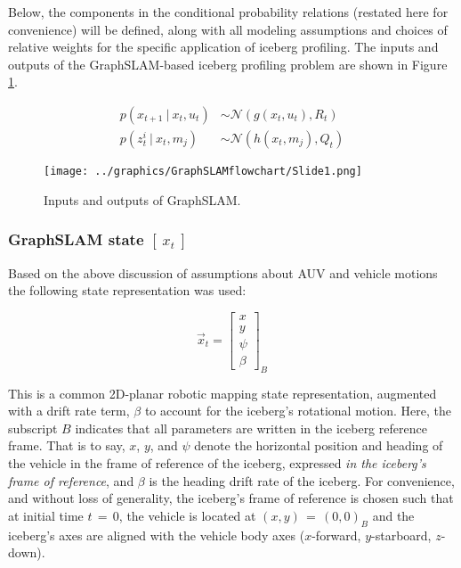 Below, the components in the conditional probability relations (restated here for convenience) will be defined, along with all modeling assumptions and choices of relative weights for the specific application of iceberg profiling. The inputs and outputs of the GraphSLAM-based iceberg profiling problem are shown in Figure \ref{fig:GraphSLAMIO}.

\begin{align}
p\left(x_{t+1}~|~x_t,u_t\right) & \sim \mathcal{N}\left(g(x_t,u_t), R_t\right) \\
p\left(z^i_{t}~|~x_t,m_j\right) & \sim \mathcal{N}\left(h(x_t,m_j), Q_t\right)
\end{align}

\begin{figure}[htb]
   \centering
   \texttt{[image: ../graphics/GraphSLAMflowchart/Slide1.png]} %
   \caption{Inputs and outputs of GraphSLAM.}
   \label{fig:GraphSLAMIO}
\end{figure}

\subsubsection{GraphSLAM state $\left[~x_t~\right]$}

Based on the above discussion of assumptions about AUV and vehicle motions the following state representation was used:

\begin{equation}
\label{eq.state}
\vec{x}_t= \left[\begin{array}{c}
                     x \\ y \\ \psi \\ \beta 
                     \end{array}\right]_B
\end{equation}

This is a common 2D-planar robotic mapping state representation, augmented with a drift rate term, $\beta$ to account for the iceberg's rotational motion. Here, the subscript $B$ indicates that all parameters are written in the iceberg reference frame. That is to say, $x$, $y$, and $\psi$ denote the horizontal position and heading of the vehicle in the frame of reference of the iceberg, expressed \emph{in the iceberg's frame of reference}, and $\beta$ is the heading drift rate of the iceberg. For convenience, and without loss of generality, the iceberg's frame of reference is chosen such that at initial time $t\,=\,0$, the vehicle is located at $(x,y)\,=\,(0,0)_B$ and the iceberg's axes are aligned with the vehicle body axes ($x$-forward, $y$-starboard, $z$-down).  

